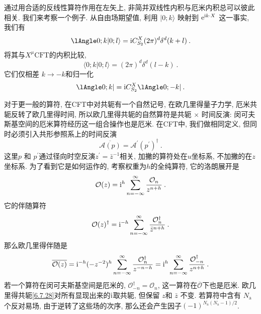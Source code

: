 通过用合适的反线性算符作用在左矢上, 非简并双线性内积与厄米内积总可以彼此相关. 我们来考察一个例子. 从自由场期望值, 
利用 $|0 ; k\rangle$ 映射到 $\mathrm{e}^{\mathrm{i} k \cdot X}$ 这一事实, 我们有
\begin{equation}
	\lAngle 0 ; k \vert 0 ; l\rangle = \mi C_{S_{2}}^{X}(2 \pi)^{d} \delta^{d}(k+l) \:. \label{6.7.25}
\end{equation}
将其与$X^{\mu} \mathrm{CFT}$的内积比较,
\begin{equation}
	\langle 0 ; k \vert 0 ; l\rangle=(2 \pi)^{d} \delta^{d}(l-k) \:. \label{6.7.26}
\end{equation}
它们仅相差 $k \rightarrow-k$和归一化
\begin{equation}
	\lAngle 0 ; k \vert = \mi C_{S_{2}}^{X}\lAngle 0 ;-k| \:. \label{6.7.27}
\end{equation}

对于更一般的算符, 在CFT中对共轭有一个自然记号, 在欧几里得量子力学,  厄米共轭反转了欧几里得时间, 所以欧几里得共轭的自然算符是共轭 $\times$ 时间反演: 
闵可夫斯基空间的厄米算符经历这一组合操作也是厄米. 在CFT中, 我们做相同定义, 但同时必须引入共形参照系上的时间反演
\begin{equation}
	\overline{\mathscr{A}(p)}=\mathscr{A}^{\prime}(p^{\prime})^{\dagger}  \:. \label{6.7.28}
\end{equation}
这里$p$ 和 $p^{\prime}$通过径向时空反演$z^{\prime}=\bar{z}^{-1}$相关, 加撇的算符处在$u$坐标系, 不加撇的在$z$坐标系. 
为了看到它是如何运作的, 考察权重为$h$的全纯算符, 它的洛朗展开是
\begin{equation}
	\mathcal{O}(z)=\mathrm{i}^{h} \sum_{n=-\infty}^{\infty} \frac{\mathcal{O}_{n}}{z^{n+h}} \:. \label{6.7.29}
\end{equation}
它的伴随算符
\begin{equation}
	\mathcal{O}(z)^{\dagger}=\mathrm{i}^{-h} \sum_{n=-\infty}^{\infty} \frac{\mathcal{O}_{n}^{\dagger}}{\bar{z}^{n+h}} \:. \label{6.7.30}
\end{equation}
那么欧几里得伴随是
\begin{equation}
	\overline{\mathcal{O}(z)}=\mathrm{i}^{-h} (-z^{-2})^{h} \sum_{n=-\infty}^{\infty} \frac{\mathcal{O}_{n}^{\dagger}}{z^{-n-h}}
	=\mathrm{i}^{h} \sum_{n=-\infty}^{\infty} \frac{\mathcal{O}_{-n}^{\dagger}}{z^{n+h}} \:. \label{6.7.31}
\end{equation}
若一个算符在闵可夫斯基空间是厄米的, $\mathcal{O}_{-n}^{\dagger}=\mathcal{O}_{n}$, 这一算符在$\overline{\mathcal{O}}$下也是厄米. 
欧几里得共轭\eqref{6.7.28}对所有显现出来的$\mathrm{i}$取共轭, 但保留 $z$和 $\bar{z}$ 不变. 
若算符中含有 $N_{\mathrm{a}}$ 个反对易场, 由于逆转了这些场的次序, 那么还会产生因子$(-1)^{N_{\mathrm{a}}\left(N_{\mathrm{a}}-1\right) / 2}$.

